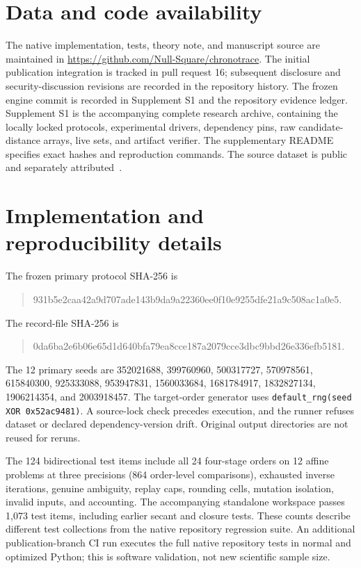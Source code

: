 \section*{Data and code availability}
The native implementation, tests, theory note, and manuscript source are maintained in \url{https://github.com/Null-Square/chronotrace}. The initial publication integration is tracked in pull request 16; subsequent disclosure and security-discussion revisions are recorded in the repository history. The frozen engine commit is recorded in Supplement S1 and the repository evidence ledger. Supplement S1 is the accompanying complete research archive, containing the locally locked protocols, experimental drivers, dependency pins, raw candidate-distance arrays, live sets, and artifact verifier. The supplementary README specifies exact hashes and reproduction commands. The source dataset is public and separately attributed~\cite{digits1998,sklearndigits}.

\appendix
\section{Implementation and reproducibility details}
The frozen primary protocol SHA-256 is
\begin{quote}\small\ttfamily
931b5e2caa42a9d707ade143b9da9a22360ee0f10e9255dfe21a9c508ac1a0e5.
\end{quote}
The record-file SHA-256 is
\begin{quote}\small\ttfamily
0da6ba2e6b06e65d1d640bfa79ea8cce187a2079cce3dbc9bbd26e336efb5181.
\end{quote}
The 12 primary seeds are 352021688, 399760960, 500317727, 570978561, 615840300, 925333088, 953947831, 1560033684, 1681784917, 1832827134, 1906214354, and 2003918457. The target-order generator uses \texttt{default\_rng(seed XOR 0x52ac9481)}. A source-lock check precedes execution, and the runner refuses dataset or declared dependency-version drift. Original output directories are not reused for reruns.

The 124 bidirectional test items include all 24 four-stage orders on 12 affine problems at three precisions (864 order-level comparisons), exhausted inverse iterations, genuine ambiguity, replay caps, rounding cells, mutation isolation, invalid inputs, and accounting. The accompanying standalone workspace passes 1,073 test items, including earlier secant and closure tests. These counts describe different test collections from the native repository regression suite. An additional publication-branch CI run executes the full native repository tests in normal and optimized Python; this is software validation, not new scientific sample size.

